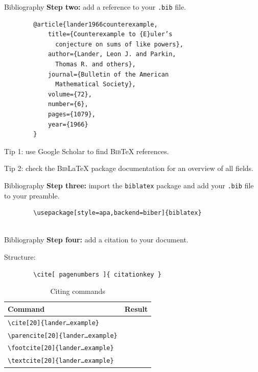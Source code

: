 \documentclass{beamer}
\newcommand{\filename}[1]{\texttt{#1}}
\newcommand{\commandopt}[3]{\texttt{\textbackslash#1[#3]\{#2\}}}
\begin{document}
\begin{frame}[fragile]{Bibliography}
    \textbf{Step two:} add a reference to your \filename{.bib} file.

        {\centering\small
            \begin{verbatim}
        @article{lander1966counterexample,
            title={Counterexample to {E}uler’s 
              conjecture on sums of like powers},
            author={Lander, Leon J. and Parkin, 
              Thomas R. and others},
            journal={Bulletin of the American 
              Mathematical Society},
            volume={72},
            number={6},
            pages={1079},
            year={1966}
        }
    \end{verbatim}}

    \bigskip
    Tip 1: use Google Scholar to find \textsc{Bib}\TeX{} references.

    Tip 2: check the \textsc{Bib}\LaTeX{} package documentation for an overview of all fields.
\end{frame}

\begin{frame}[fragile]{Bibliography}
    \textbf{Step three:} import the \texttt{biblatex} package and add your \filename{.bib} file to your preamble.
    \medskip
    \centering
    \small
    \begin{verbatim}
        \usepackage[style=apa,backend=biber]{biblatex}
        
    \end{verbatim}
\end{frame}

\begin{frame}[fragile]{Bibliography}
    \textbf{Step four:} add a citation to your document.

    Structure:

    \begin{verbatim}
        \cite[ pagenumbers ]{ citationkey }
    \end{verbatim}

    \begin{table}[ht]
        \centering
        \small
        \begin{tabular}{ll}
            \toprule
            \textbf{Command}                                  & \textbf{Result}                          \\
            \midrule
            \commandopt{cite}{lander\ldots{}example}{20}      & \cite[20]{lander1966counterexample}      \\
            \commandopt{parencite}{lander\ldots{}example}{20} & \parencite[20]{lander1966counterexample} \\
            \commandopt{footcite}{lander\ldots{}example}{20}  & \footnotemark                            \\
            \commandopt{textcite}{lander\ldots{}example}{20}  & \textcite[20]{lander1966counterexample}  \\
            \bottomrule
        \end{tabular}
        \caption{Citing commands}\label{tblcite}
    \end{table}
\end{frame}
\end{document}
